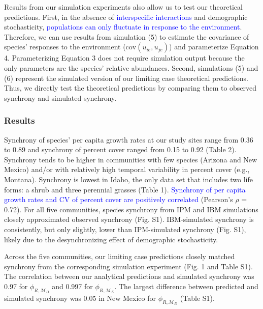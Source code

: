 \documentclass[12pt,]{article}
\begin{document}
Results from our simulation experiments also allow us to test our
theoretical predictions. First, in the absence of
\textcolor{blue}{interspecific interactions} and demographic
stochasticity,
\textcolor{blue}{populations can only fluctuate in response to the environment}.
Therefore, we can use results from simulation (5) to estimate the
covariance of species' responses to the environment
(\(\text{cov}(u_{ie}, u_{je})\)) and parameterize Equation 4.
Parameterizing Equation 3 does not require simulation output because the
only parameters are the species' relative abundances. Second,
simulations (5) and (6) represent the simulated version of our limiting
case theoretical predictions. Thus, we directly test the theoretical
predictions by comparing them to observed synchrony and simulated
synchrony.

\subsubsection{Results}\label{results}

Synchrony of species' per capita growth rates at our study sites range
from 0.36 to 0.89 and synchrony of percent cover ranged from 0.15 to
0.92 (Table 2). Synchrony tends to be higher in communities with few
species (Arizona and New Mexico) and/or with relatively high temporal
variability in percent cover (e.g., Montana). Synchrony is lowest in
Idaho, the only data set that includes two life forms: a shrub and three
perennial grasses (Table 1).
\textcolor{blue}{Synchrony of per capita growth rates and CV of percent cover are positively correlated}
(Pearson's \(\rho\) = 0.72). For all five communities, species synchrony
from IPM and IBM simulations closely approximated observed synchrony
(Fig. S1). IBM-simulated synchrony is consistently, but only slightly,
lower than IPM-simulated synchrony (Fig. S1), likely due to the
desynchronizing effect of demographic stochasticity.

Across the five communities, our limiting case predictions closely
matched synchrony from the corresponding simulation experiment (Fig. 1
and Table S1). The correlation between our analytical predictions and
simulated synchrony was 0.97 for \(\phi_{R,\mathcal{M}_D}\) and 0.997
for \(\phi_{R,\mathcal{M}_E}\). The largest difference between predicted
and simulated synchrony was 0.05 in New Mexico for
\(\phi_{R,\mathcal{M}_D}\) (Table S1).
\end{document}
